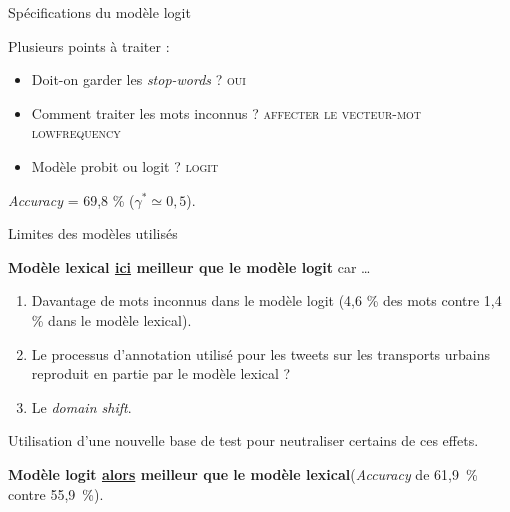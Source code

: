 \documentclass[10pt,xcolor=table,color={dvipsnames,usenames},ignorenonframetext,usepdftitle=false,french]{beamer}
\providecommand{\tightlist}{%
  \setlength{\parskip}{0pt}
  }
\begin{document}
\begin{frame}{Spécifications du modèle logit}
\protect\hypertarget{spuxe9cifications-du-moduxe8le-logit}{}

Plusieurs points à traiter :

\begin{itemize}
\item
  Doit-on garder les \emph{stop-words} ? \textsc{oui}
\item
  Comment traiter les mots inconnus ?
  \textsc{affecter le vecteur-mot lowfrequency}
\item
  Modèle probit ou logit ? \textsc{logit}
\end{itemize}

\bigskip

\bigskip

\faArrowCircleRight{} \emph{Accuracy} = 69,8 \%
(\(\gamma^* \simeq 0,5\)).

\end{frame}

\begin{frame}{Limites des modèles utilisés}
\protect\hypertarget{limites-des-moduxe8les-utilisuxe9s}{}

\textbf{Modèle lexical \underline{ici} meilleur que le modèle logit} car
\dots

\begin{enumerate}
[1.]
\tightlist
\item
  Davantage de mots inconnus dans le modèle logit (4,6 \% des mots
  contre 1,4 \% dans le modèle lexical).
\end{enumerate}

\pause

\begin{enumerate}
[1.]
\setcounter{enumi}{1}
\tightlist
\item
  Le processus d’annotation utilisé pour les tweets sur les transports
  urbains reproduit en partie par le modèle lexical ?
\end{enumerate}

\pause

\begin{enumerate}
[1.]
\setcounter{enumi}{2}
\tightlist
\item
  Le \emph{domain shift}.
\end{enumerate}

\pause

\bigskip

\faArrowCircleRight{} Utilisation d’une nouvelle base de test pour
neutraliser certains de ces effets.

\textbf{Modèle logit \underline{alors} meilleur que le modèle
lexical}\newline(\emph{Accuracy} de 61,9~\% contre 55,9~\%).

\end{frame}
\end{document}
